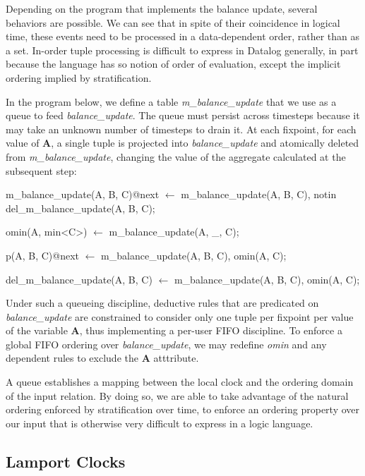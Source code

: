 Depending on the program that implements the balance update, several behaviors are possible.  We can see that in spite of their
coincidence in logical time, these events need to be processed in a data-dependent order, rather than as a set.  In-order tuple 
processing is difficult to express in Datalog generally, in part because the language has so notion of order of evaluation, except
the implicit ordering implied by stratification.

In the program below, we define a table \emph{m\_balance\_update} that we use as a queue to feed \emph{balance\_update}.  The queue must persist across
timesteps because it may take an unknown number of timesteps to drain it.  At each fixpoint, for each value of \textbf{A}, a single
tuple is projected into \emph{balance\_update} and atomically deleted from \emph{m\_balance\_update}, changing the value of the aggregate calculated at the
subsequent step:


\begin{Dedalus}

m\_balance\_update(A, B, C)@next \(\leftarrow\)
  m\_balance\_update(A, B, C),
  notin del\_m\_balance\_update(A, B, C);

omin(A, min<C>) \(\leftarrow\)
  m\_balance_update(A, _, C);

p(A, B, C)@next \(\leftarrow\)
  m\_balance\_update(A, B, C),
  omin(A, C);

del\_m\_balance\_update(A, B, C) \(\leftarrow\)
  m\_balance\_update(A, B, C),
  omin(A, C);
\end{Dedalus}

Under such a queueing discipline, deductive rules that are predicated on \emph{balance\_update} are constrained to consider only one tuple per fixpoint
per value of the variable \textbf{A}, thus implementing a per-user FIFO discipline.  To enforce a global FIFO ordering over \emph{balance\_update}, 
we may redefine \emph{omin} and any dependent rules to exclude the \textbf{A} atttribute.

A queue establishes a mapping between the local clock and the ordering domain of the input relation. By doing so, we are able to take
advantage of the natural ordering enforced by stratification over time, to enforce an ordering property over our input that is otherwise 
very difficult to express in a logic language.

\subsection{Lamport Clocks}

